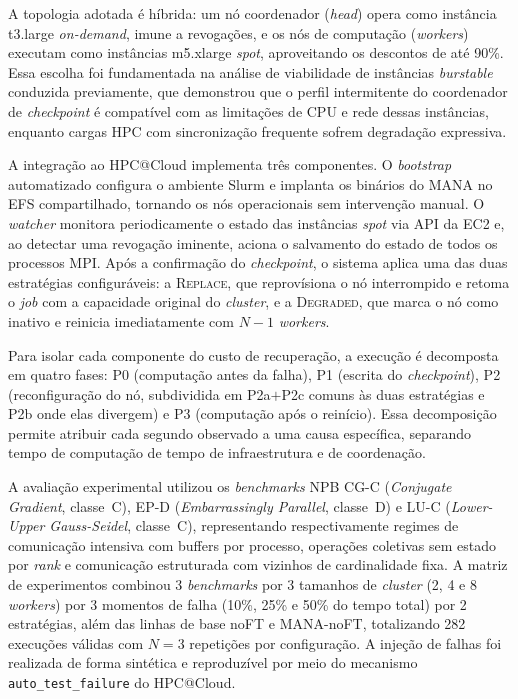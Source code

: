 \begin{resumo}
A topologia adotada é híbrida: um nó coordenador (\textit{head}) opera como
instância t3.large \textit{on-demand}, imune a revogações, e os nós de
computação (\textit{workers}) executam como instâncias m5.xlarge \textit{spot},
aproveitando os descontos de até 90\%. Essa escolha foi fundamentada na análise
de viabilidade de instâncias \textit{burstable} conduzida previamente, que
demonstrou que o perfil intermitente do coordenador de \textit{checkpoint} é
compatível com as limitações de CPU e rede dessas instâncias, enquanto cargas
HPC com sincronização frequente sofrem degradação expressiva.

A integração ao HPC@Cloud implementa três componentes. O \textit{bootstrap}
automatizado configura o ambiente Slurm e implanta os binários do MANA no EFS
compartilhado, tornando os nós operacionais sem intervenção manual. O
\textit{watcher} monitora periodicamente o estado das instâncias \textit{spot}
via API da EC2 e, ao detectar uma revogação iminente, aciona o salvamento do
estado de todos os processos MPI. Após a confirmação do
\textit{checkpoint}, o sistema aplica uma das duas estratégias configuráveis: a
\textsc{Replace}, que reprovísiona o nó interrompido e retoma o \textit{job}
com a capacidade original do \textit{cluster}, e a \textsc{Degraded}, que marca
o nó como inativo e reinicia imediatamente com $N{-}1$ \textit{workers}.

Para isolar cada componente do custo de recuperação, a execução é decomposta em
quatro fases: P0 (computação antes da falha), P1 (escrita do
\textit{checkpoint}), P2 (reconfiguração do nó, subdividida em P2a$+$P2c
comuns às duas estratégias e P2b onde elas divergem) e P3 (computação após o
reinício). Essa decomposição permite atribuir cada segundo observado a uma causa
específica, separando tempo de computação de tempo de infraestrutura e de
coordenação.

A avaliação experimental utilizou os \textit{benchmarks} NPB CG-C
(\textit{Conjugate Gradient}, classe~C), EP-D (\textit{Embarrassingly Parallel},
classe~D) e LU-C (\textit{Lower-Upper Gauss-Seidel}, classe~C), representando
respectivamente regimes de comunicação intensiva com buffers por processo,
operações coletivas sem estado por \textit{rank} e comunicação estruturada com
vizinhos de cardinalidade fixa. A matriz de experimentos combinou 3
\textit{benchmarks} por 3 tamanhos de \textit{cluster} (2, 4 e 8
\textit{workers}) por 3 momentos de falha (10\%, 25\% e 50\% do tempo total)
por 2 estratégias, além das linhas de base noFT e MANA-noFT, totalizando 282
execuções válidas com $N{=}3$ repetições por configuração. A injeção de falhas
foi realizada de forma sintética e reproduzível por meio do mecanismo
\texttt{auto\_test\_failure} do HPC@Cloud.



\end{resumo}
